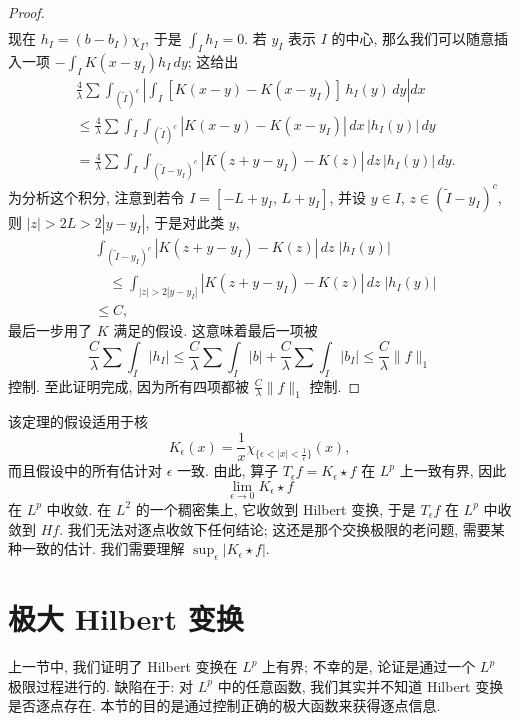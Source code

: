 \begin{proof}
\begin{align*}
\end{align*}
现在 $h_I=(b-b_I)\chi_I$, 于是 $\int_I h_I=0$. 若 $y_I$ 表示 $I$ 的中心, 那么我们可以随意插入一项 $-\int_I K(x-y_I)h_I\,dy$; 这给出
\begin{align*}
&\frac{4}{\lambda}\sum\int_{(\tilde{I})^{c}}\left|\int_{I}[K(x-y)-K(x-y_{I})]\,h_{I}(y)\,dy\right|dx \\
&\leq\frac{4}{\lambda}\sum\int_{I}\int_{(\tilde{I})^{c}}|K(x-y)-K(x-y_{I})|\,dx\,|h_{I}(y)|\,dy \\
&=\frac{4}{\lambda}\sum\int_{I}\int_{(\tilde{I}-y_{I})^{c}}|K(z+y-y_{I})-K(z)|\,dz\,|h_{I}(y)|\,dy.
\end{align*}
为分析这个积分, 注意到若令 $I=[-L+y_I,\,L+y_I]$, 并设 $y\in I$, $z\in(\tilde{I}-y_I)^c$, 则 $|z|>2L>2|y-y_I|$, 于是对此类 $y$,
\begin{align*}
&\int_{(\tilde{I}-y_{I})^{c}}|K(z+y-y_{I})-K(z)|\,dz\;|h_{I}(y)| \\
&\quad \leq\int_{|z|>2|y-y_{I}|}|K(z+y-y_{I})-K(z)|\,dz\;|h_{I}(y)| \\
&\leq C,
\end{align*}
最后一步用了 $K$ 满足的假设. 这意味着最后一项被
\[
\frac{C}{\lambda}\sum\int_{I}|h_{I}|
\leq\frac{C}{\lambda}\sum\int_{I}|b|+\frac{C}{\lambda}\sum\int_{I}|b_{I}|
\leq\frac{C}{\lambda}\|f\|_{1}
\]
控制. 至此证明完成, 因为所有四项都被 $\frac{C}{\lambda}\|f\|_1$ 控制.
\end{proof}

\begin{remark}\label{rem:2.33}
该定理的假设适用于核
\[
K_{\epsilon}(x)=\frac{1}{x}\chi_{\{\epsilon<|x|<\frac{1}{\epsilon}\}}(x),
\]
而且假设中的所有估计对 $\epsilon$ 一致. 由此, 算子 $T_{\epsilon}f=K_{\epsilon}\star f$ 在 $L^p$ 上一致有界, 因此
\[
\lim_{\epsilon\to0}K_{\epsilon}\star f
\]
在 $L^p$ 中收敛. 在 $L^2$ 的一个稠密集上, 它收敛到 Hilbert 变换, 于是 $T_\epsilon f$ 在 $L^p$ 中收敛到 $Hf$. 我们无法对逐点收敛下任何结论; 这还是那个交换极限的老问题, 需要某种一致的估计. 我们需要理解 $\sup_\epsilon|K_\epsilon\star f|$.
\end{remark}

\section{极大 Hilbert 变换}
\label{sec:2.5}

上一节中, 我们证明了 Hilbert 变换在 $L^{p}$ 上有界; 不幸的是, 论证是通过一个 $L^{p}$ 极限过程进行的. 缺陷在于: 对 $L^{p}$ 中的任意函数, 我们其实并不知道 Hilbert 变换是否逐点存在. 本节的目的是通过控制正确的极大函数来获得逐点信息.

